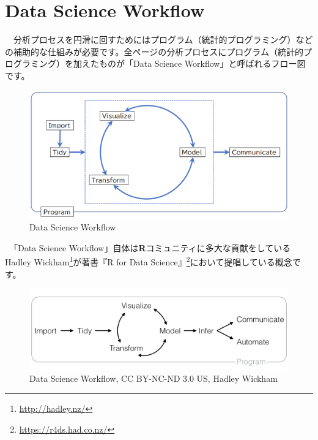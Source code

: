 \documentclass[
  12pt,
]{book}
\DeclareRobustCommand{\href}[2]{#2\footnote{\url{#1}}}
\begin{document}
\hypertarget{data-science-workflow}{%
\section*{Data Science Workflow}\label{data-science-workflow}}

　分析プロセスを円滑に回すためにはプログラム（統計的プログラミング）などの補助的な仕組みが必要です。全ページの分析プロセスにプログラム（統計的プログラミング）を加えたものが「Data Science Workflow」と呼ばれるフロー図です。

\begin{figure}[H]

{\centering \includegraphics[width=0.9\linewidth,]{./fig/DSWF/data_science_workflow} 

}

\caption{Data Science Workflow}\label{fig:unnamed-chunk-18}
\end{figure}

\newpage

　「Data Science Workflow」自体は\textbf{R}コミュニティに多大な貢献をしている\href{http://hadley.nz/}{Hadley Wickham}が著書\href{https://r4ds.had.co.nz/}{『R for Data Science』}において提唱している概念です。

\begin{figure}[H]

{\centering \includegraphics[width=0.9\linewidth,]{fig/data-science} 

}

\caption{Data Science Workflow, CC BY-NC-ND 3.0 US, Hadley Wickham}\label{fig:unnamed-chunk-19}
\end{figure}
\end{document}
